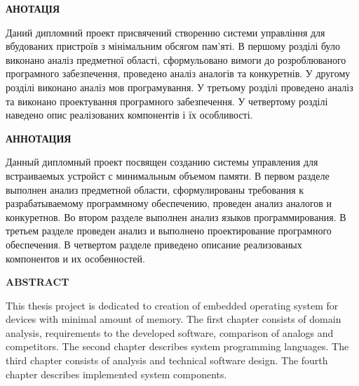 \documentclass[main.tex]{subfiles}
\begin{document}
\begin{specialpage}
  \begin{spacing}{1.5}

  \textbf{АНОТАЦІЯ}\\
  \vspace{5mm}
  \begin{minipage}{\textwidth}
  Даний дипломний проект присвячений створенню системи управління для вбудованих пристроїв з мінімальним обсягом пам'яті. В першому розділі було виконано аналіз предметної області, сформульовано вимоги до розроблюваного програмного забезпечення, проведено аналіз аналогів та конкуретнів.
  У другому розділі виконано аналіз мов програмування.
  У третьому розділі проведено аналіз та виконано проектування програмного забезпечення.
  У четвертому розділі наведено опис реалізованих компонентів і їх особливості.
  \end{minipage}

  \vspace{1cm}
  \textbf{АННОТАЦИЯ}\\
  \vspace{5mm}
  \begin{minipage}{\textwidth}
  Данный дипломный проект посвящен созданию системы управления для встраиваемых устройст с минимальным объемом памяти. В первом разделе выполнен анализ предметной области, сформулированы требования к разрабатываемому программному обеспечению, проведен анализ аналогов и конкуретнов.
  Во втором разделе выполнен анализ языков программирования.
  В третьем разделе проведен анализ и выполнено проектирование програмного обеспечения.
  В четвертом разделе приведено описание реализованых компонентов и их особенностей.
  \end{minipage}

  \vspace{1cm}
  \textbf{ABSTRACT}\\
  \vspace{5mm}
  \begin{minipage}{\textwidth}
  This thesis project is dedicated to creation of embedded operating system for devices with minimal amount of memory. The first chapter consists of domain analysis, requirements to the developed software, comparison of analogs and competitors.
  The second chapter describes system programming languages.
  The third chapter consists of analysis and technical software design.
  The fourth chapter describes implemented system components.
  \end{minipage}

  \end{spacing}
\end{specialpage}
\end{document}
